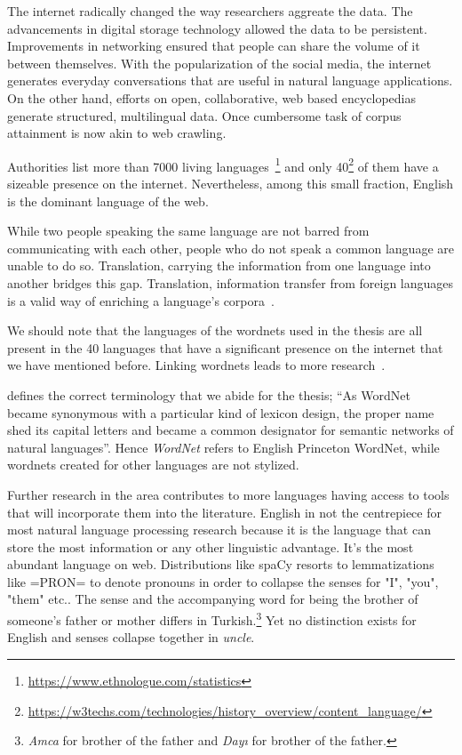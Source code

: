 The internet radically changed the way researchers aggreate the data.
The advancements in digital storage technology allowed the data to be persistent.
Improvements in networking ensured that people can share the volume of it between themselves.
With the popularization of the social media, the internet generates everyday conversations that are useful in natural language applications.
On the other hand, efforts on open, collaborative, web based encyclopedias generate structured, multilingual data.
Once cumbersome task of corpus attainment is now akin to web crawling.

Authorities list more than 7000 living languages~\footnote{\url{https://www.ethnologue.com/statistics}} and only 40\footnote{\url{https://w3techs.com/technologies/history_overview/content_language/}} of them have a sizeable presence on the internet.
Nevertheless, among this small fraction, English is the dominant language of the web.

While two people speaking the same language are not barred from communicating with each other, people who do not speak a common language are unable to do so.
Translation, carrying the information from one language into another bridges this gap.
Translation, information transfer from foreign languages is a valid way of enriching a language's corpora~\cite{ibrahim_usta_turkce_2006}.

We should note that the languages of the wordnets used in the thesis are all present in the 40 languages that have a significant presence on the internet that we have mentioned before.
Linking wordnets leads to more research~\cite{sagot_building_2008}.

\textcite{fellbaum_semantic_1998} defines the correct terminology that we abide for the thesis; \enquote{As WordNet became synonymous with a particular kind of lexicon design, the proper name shed its capital letters and became a common designator for semantic networks of natural languages}.
Hence \emph{WordNet} refers to English Princeton WordNet, while wordnets created for other languages are not stylized.

Further research in the area contributes to more languages having access to tools that will incorporate them into the literature.
English in not the centrepiece for most natural language processing research because it is the language that can store the most information or any other linguistic advantage.
It's the most abundant language on web.
Distributions like spaCy resorts to lemmatizations like =PRON= to denote pronouns in order to collapse the senses for "I", "you", "them" etc.\@.
The sense and the accompanying word for being the brother of someone's father or mother differs in Turkish.\footnote{\emph{Amca} for brother of the father and \emph{Dayı} for brother of the father.}
Yet no distinction exists for English and senses collapse together in \emph{uncle}.

